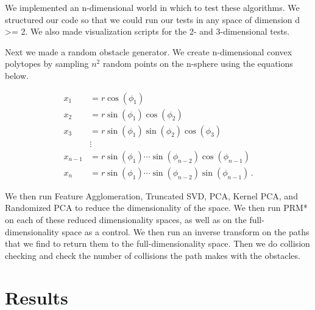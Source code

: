 \documentclass[12pt]{article}
\begin{document}
We implemented an n-dimensional world in which to test these algorithms. We structured our code so that we could run our tests in any space of dimension d >= 2. We also made visualization scripts for the 2- and 3-dimensional tests.

Next we made a random obstacle generator. We create n-dimensional convex polytopes by sampling $n^{2}$ random points on the n-sphere using the equations below. 

\begin{align}
x_1 &= r \cos(\phi_1) \\
x_2 &= r \sin(\phi_1) \cos(\phi_2) \\
x_3 &= r \sin(\phi_1) \sin(\phi_2) \cos(\phi_3) \\
    &\vdots\\
x_{n-1} &= r \sin(\phi_1) \cdots \sin(\phi_{n-2}) \cos(\phi_{n-1}) \\
x_n &= r \sin(\phi_1) \cdots \sin(\phi_{n-2}) \sin(\phi_{n-1}) \,.
\end{align}

We then run Feature Agglomeration, Truncated SVD, PCA, Kernel PCA, and Randomized PCA to reduce the dimensionality of the space. We then run PRM* on each of these reduced dimensionality spaces, as well as on the full-dimensionality space as a control. We then run an inverse transform on the paths that we find to return them to the full-dimensionality space. Then we do collision checking and check the number of collisions the path makes with the obstacles.

\section{Results}
\end{document}
